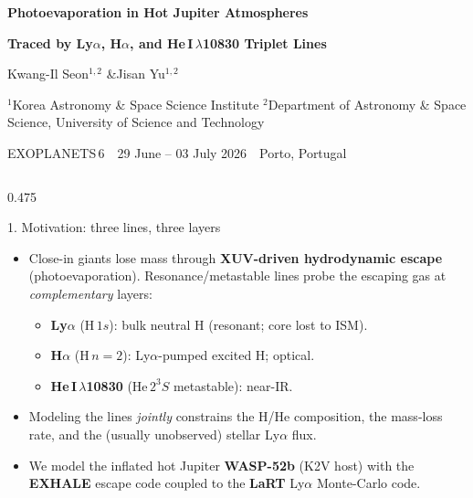 \documentclass[final]{beamer}
\newlength{\colht}\setlength{\colht}{0.848\paperheight}
\begin{document}
\begin{frame}[t]{}

\begin{tcolorbox}[colback=kasiblue,colframe=kasiblue,sharp corners,boxrule=0pt,
  left=12mm,right=12mm,top=6mm,bottom=6mm]
\begin{center}
{\color{white}\Huge\bfseries Photoevaporation in Hot Jupiter Atmospheres\par}
\vspace{3mm}
{\color{white}\Large\bfseries Traced by Ly$\alpha$, H$\alpha$, and He\,I\,$\lambda$10830 Triplet Lines\par}
\vspace{6mm}
{\color{white}\large Kwang-Il Seon$^{1,2}$ \quad\&\quad Jisan Yu$^{1,2}$\par}
\vspace{2mm}
{\color{kasilight}\normalsize $^{1}$Korea Astronomy \& Space Science Institute \quad
$^{2}$Department of Astronomy \& Space Science, University of Science and Technology\par}
\vspace{2mm}
{\color{kasilight}\normalsize EXOPLANETS\,6 \,\textbullet\, 29 June -- 03 July 2026 \,\textbullet\, Porto, Portugal\par}
\end{center}
\end{tcolorbox}
\vspace{6mm}

\begin{columns}[t]

\begin{column}{0.475\paperwidth}
\begin{minipage}[t][\colht][s]{\linewidth}

\begin{block}{1. Motivation: three lines, three layers}
\begin{itemize}
\item Close-in giants lose mass through \textbf{XUV-driven hydrodynamic escape}
  (photoevaporation). Resonance/metastable lines probe the escaping gas at
  \emph{complementary} layers:
  \begin{itemize}
  \item \textbf{Ly$\alpha$} (H\,$1s$): bulk neutral H (resonant; core lost to ISM).
  \item \textbf{H$\alpha$} (H\,$n{=}2$): Ly$\alpha$-pumped excited H; optical.
  \item \textbf{He\,I\,$\lambda$10830} (He\,$2^3S$ metastable): near-IR.
  \end{itemize}
\item Modeling the lines \emph{jointly} constrains the H/He composition, the
  mass-loss rate, and the (usually unobserved) stellar Ly$\alpha$ flux.
\item We model the inflated hot Jupiter \textbf{WASP-52b} (K2V host) with the
  \textbf{EXHALE} escape code coupled to the \textbf{LaRT} Ly$\alpha$ Monte-Carlo code.
\end{itemize}
\end{block}


\end{minipage}
\end{column}
\end{columns}
\end{frame}
\end{document}
